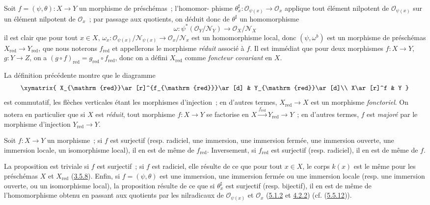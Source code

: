 \begin{env}[5.1.5]
\label{I.5.1.5-fr}
Soit $f=(\psi,\theta):X\to Y$ un morphisme de préschémas~; l'homomor-
phisme $\theta_x^\sharp:\mathscr{O}_{\psi(x)}\to\mathscr{O}_x$ applique tout
élément nilpotent de $\mathscr{O}_{\psi(x)}$ sur un élément nilpotent de
$\mathscr{O}_x$~; par passage aux quotients, on déduit donc de $\theta^\sharp$
un homomorphisme
\[
  \omega:\psi^*(\mathscr{O}_Y/\mathscr{N}_Y)
  \longrightarrow \mathscr{O}_X/\mathscr{N}_X
\]
il est clair que pour tout $x\in X$,
$\omega_x:\mathscr{O}_{\psi(x)}/\mathscr{N}_{\psi(x)}
\to\mathscr{O}_x/\mathscr{N}_x$ est un homomorphisme local, donc
$(\psi,\omega^b)$ est un morphisme de préschémas
$X_{\mathrm{red}}\to Y_{\mathrm{red}}$, que nous noterons $f_{\mathrm{red}}$
et appellerons le morphisme \emph{réduit} associé à $f$. Il est immédiat que
pour deux morphismes $f:X\to Y$, $g:Y\to Z$, on a
$(g\circ f)_{\mathrm{red}}=g_{\mathrm{red}}\circ f_{\mathrm{red}}$, donc on a
défini $X_{\mathrm{red}}$ comme \emph{foncteur covariant} en $X$.

La définition précédente montre que le diagramme
\[
  \xymatrix{
    X_{\mathrm{red}}\ar[r]^{f_{\mathrm{red}}}\ar[d] &
    Y_{\mathrm{red}}\ar[d]\\
    X\ar[r]^f & Y
  }
\]
est commutatif, les flèches verticales étant les morphismes d'injection~; en
d'autres termes, $X_{\mathrm{red}}\to X$ est un morphisme \emph{fonctoriel}.
On notera en particulier que si $X$ est \emph{réduit}, tout morphisme
$f:X\to Y$ se factorise en
$X\xrightarrow{f_{\mathrm{red}}}Y_{\mathrm{red}}\to Y$~; en d'autres termes,
$f$ est \emph{majoré} par le morphisme d'injection
$Y_{\mathrm{red}}\to Y$.
\end{env}

\begin{proposition}[5.1.6]
\label{I.5.1.6-fr}
Soit $f:X\to Y$ un morphisme~; si $f$ est surjectif (resp. radiciel, une
immersion, une immersion fermée, une immersion ouverte, une immersion locale,
un isomorphisme local), il en est de même de $f_{\mathrm{red}}$. Inversement,
si $f_{\mathrm{red}}$ est surjectif (resp. radiciel), il en est de même de
$f$.
\end{proposition}

La proposition est triviale si $f$ est surjectif~; si $f$ est radiciel, elle
résulte de ce que pour tout $x\in X$, le corps $k(x)$ est le même pour les
préschémas $X$ et $X_{\mathrm{red}}$
(\hyperref[I.3.5.8-fr]{3.5.8}). Enfin, si $f=(\psi,\theta)$ est une immersion,
une immersion fermée ou une immersion locale (resp. une immersion ouverte, ou
un isomorphisme local), la proposition résulte de ce que si
$\theta_x^\sharp$ est surjectif (resp. bijectif), il en est de même de
l'homomorphisme obtenu en passant aux quotients par les nilradicaux de
$\mathscr{O}_{\psi(x)}$ et $\mathscr{O}_x$
(\hyperref[I.5.1.2-fr]{5.1.2} et \hyperref[I.4.2.2-fr]{4.2.2})
(cf. (\hyperref[I.5.5.12-fr]{5.5.12})).

